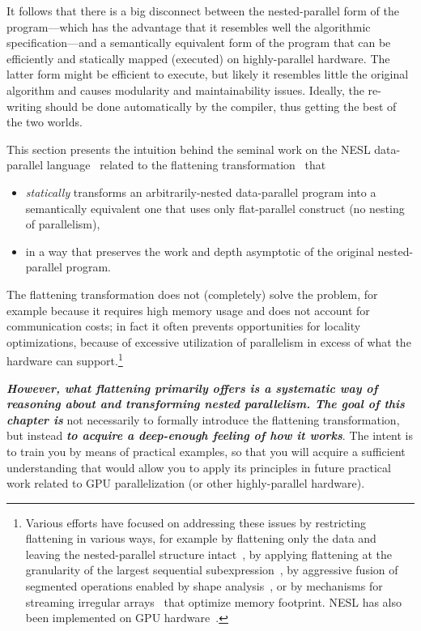 \documentclass[acmsmall,review]{acmart}\settopmatter{printfolios=true,printccs=false,printacmref=false}
\begin{document}
It follows that there is a big disconnect between the nested-parallel
form of the program---which has the advantage that it resembles well
the algorithmic specification---and a semantically equivalent form
of the program that can be efficiently and statically mapped (executed) 
on highly-parallel hardware. The latter form might be efficient to
execute, but likely it resembles little the original algorithm and
causes modularity and maintainability issues. Ideally, the re-writing
should be done automatically by the compiler, thus getting the best
of the two worlds. 

This section presents the intuition behind the seminal work on the
NESL data-parallel language~\cite{BlellochCACM96NESL} related to
the flattening transformation~\cite{blelloch1994implementation}
that
\begin{itemize}
    \item \emph{statically} transforms an arbitrarily-nested data-parallel 
        program into a semantically equivalent one that uses only 
        flat-parallel construct (no nesting of parallelism), 
    \item in a way that preserves the work and depth asymptotic
        of the original nested-parallel program.
\end{itemize}

The flattening transformation does not (completely) solve the problem, 
for example because it requires high memory usage and does not
account for communication costs; in fact it often prevents 
opportunities for locality optimizations, because of excessive
utilization of parallelism in excess of what the hardware can 
support.\footnote{Various efforts have focused on addressing these issues by 
restricting flattening in various ways, for example by flattening 
only the data and leaving the nested-parallel structure 
intact~\cite{Bergstrom:2013:DFN:2442516.2442525},
by applying flattening at the granularity of the largest sequential
subexpression~\cite{Keller:2012:VA:2364506.2364512}, by aggressive
fusion of segmented operations enabled by shape analysis~\cite{nessie:cpc15},
or by mechanisms for streaming irregular 
arrays~\cite{madsen2016streaming,AccelerateStreaming} that optimize
memory footprint. NESL has also been implemented on GPU 
hardware~\cite{Bergstrom:2012:NDG:2398856.2364563}.} 

\textbf{\em However, what flattening primarily offers is a systematic way 
of reasoning about and transforming nested parallelism. The goal of this 
chapter is} not necessarily to formally introduce the flattening 
transformation, but instead \textbf{\em to acquire a deep-enough feeling 
of how it works}. The intent is to train you by means of practical 
examples, so that you will acquire a sufficient understanding that would 
allow you to apply its principles in future practical work related to 
GPU parallelization (or other highly-parallel hardware).  
\end{document}
